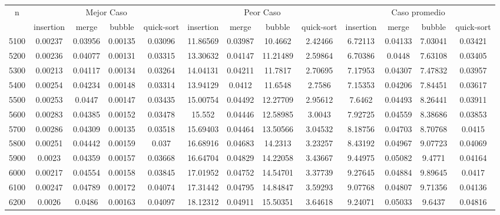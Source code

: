 \documentclass[conference]{IEEEtran}
\begin{document}
\begin{table}[!ht]
\begin{tabular}{|c|c|c|c|c|c|c|c|c|c|c|c|c|}
\hline
\multirow{2}{*}{n} & \multicolumn{4}{c|}{Mejor Caso} & \multicolumn{4}{c|}{Peor Caso} & \multicolumn{4}{c|}{Caso promedio} \\ 
\cline{2-13}
& insertion & merge & bubble & quick-sort & insertion & merge & bubble & quick-sort & insertion & merge & bubble & quick-sort \\ 
\hline
5100 & 0.00237 & 0.03956 & 0.00135 & 0.03096 & 11.86569 & 0.03987 & 10.4662 & 2.42466 &6.72113 & 0.04133 & 7.03041 & 0.03421 \\
\hline
5200 & 0.00236 & 0.04077 & 0.00131 & 0.03315 & 13.30632 & 0.04147 & 11.21489 & 2.59864 &6.70386 & 0.0448 & 7.63108 & 0.03405 \\
\hline
5300 & 0.00213 & 0.04117 & 0.00134 & 0.03264 & 14.04131 & 0.04211 & 11.7817 & 2.70695 &7.17953 & 0.04307 & 7.47832 & 0.03957 \\
\hline
5400 & 0.00254 & 0.04234 & 0.00148 & 0.03314 & 13.94129 & 0.0412 & 11.6548 & 2.7586 &7.15353 & 0.04206 & 7.84451 & 0.03617 \\
\hline
5500 & 0.00253 & 0.0447 & 0.00147 & 0.03435 & 15.00754 & 0.04492 & 12.27709 & 2.95612 &7.6462 & 0.04493 & 8.26441 & 0.03911 \\
\hline
5600 & 0.00283 & 0.04385 & 0.00152 & 0.03478 & 15.552 & 0.04446 & 12.58985 & 3.0043 &7.92725 & 0.04559 & 8.38686 & 0.03853 \\
\hline
5700 & 0.00286 & 0.04309 & 0.00135 & 0.03518 & 15.69403 & 0.04464 & 13.50566 & 3.04532 &8.18756 & 0.04703 & 8.70768 & 0.0415 \\
\hline
5800 & 0.00251 & 0.04442 & 0.00159 & 0.037 & 16.68916 & 0.04683 & 14.2313 & 3.23257 &8.43192 & 0.04967 & 9.07723 & 0.04069 \\
\hline
5900 & 0.0023 & 0.04359 & 0.00157 & 0.03668 & 16.64704 & 0.04829 & 14.22058 & 3.43667 &9.44975 & 0.05082 & 9.4771 & 0.04164 \\
\hline
6000 & 0.00217 & 0.04554 & 0.00158 & 0.03845 & 17.01952 & 0.04752 & 14.54701 & 3.37739 &9.27645 & 0.04884 & 9.89645 & 0.0417 \\
\hline
6100 & 0.00247 & 0.04789 & 0.00172 & 0.04074 & 17.31442 & 0.04795 & 14.84847 & 3.59293 &9.07768 & 0.04807 & 9.71356 & 0.04136 \\
\hline
6200 & 0.0026 & 0.0486 & 0.00163 & 0.04097 & 18.12312 & 0.04911 & 15.50351 & 3.64618 &9.24071 & 0.05033 & 9.6437 & 0.04816 \\
\hline

\end{tabular}
\end{table}
\end{document}
